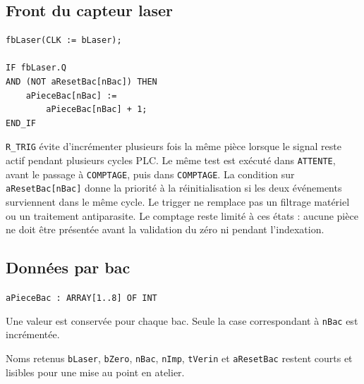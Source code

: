
\noindent
\begin{minipage}[t]{0.355\textwidth}\vspace{0pt}
  \subsection{Front du capteur laser}
\begin{lstlisting}[style=stcode]
fbLaser(CLK := bLaser);

IF fbLaser.Q
AND (NOT aResetBac[nBac]) THEN
    aPieceBac[nBac] :=
        aPieceBac[nBac] + 1;
END_IF
\end{lstlisting}

  \small
  \texttt{R\_TRIG} évite d'incrémenter plusieurs fois la même pièce lorsque le signal reste actif pendant plusieurs cycles PLC. Le même test est exécuté dans \texttt{ATTENTE}, avant le passage à \texttt{COMPTAGE}, puis dans \texttt{COMPTAGE}. La condition sur \texttt{aResetBac[nBac]} donne la priorité à la réinitialisation si les deux événements surviennent dans le même cycle. Le trigger ne remplace pas un filtrage matériel ou un traitement antiparasite. Le comptage reste limité à ces états : aucune pièce ne doit être présentée avant la validation du zéro ni pendant l'indexation.

  \subsection{Données par bac}
  \begin{card}
    \texttt{aPieceBac : ARRAY[1..8] OF INT}\par\small
    Une valeur est conservée pour chaque bac. Seule la case correspondant à \texttt{nBac} est incrémentée.
  \end{card}

  \begin{notebox}{Noms retenus}
    \texttt{bLaser}, \texttt{bZero}, \texttt{nBac}, \texttt{nImp}, \texttt{tVerin} et \texttt{aResetBac} restent courts et lisibles pour une mise au point en atelier.
  \end{notebox}
\end{minipage}\hfill

